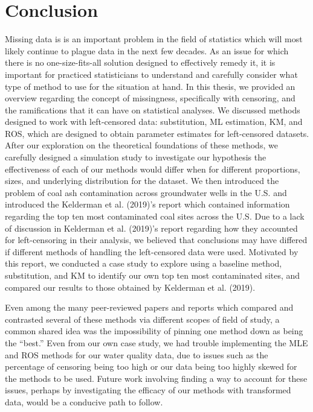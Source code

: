 \documentclass[12pt, twoside]{amherstthesis}
\begin{document}
\hypertarget{conclusion}{%
\chapter{Conclusion}\label{conclusion}}

Missing data is is an important problem in the field of statistics which will most likely continue to plague data in the next few decades. As an issue for which there is no one-size-fits-all solution designed to effectively remedy it, it is important for practiced statisticians to understand and carefully consider what type of method to use for the situation at hand. In this thesis, we provided an overview regarding the concept of missingness, specifically with censoring, and the ramifications that it can have on statistical analyses. We discussed methods designed to work with left-censored data: substitution, ML estimation, KM, and ROS, which are designed to obtain parameter estimates for left-censored datasets. After our exploration on the theoretical foundations of these methods, we carefully designed a simulation study to investigate our hypothesis the effectiveness of each of our methods would differ when for different proportions, sizes, and underlying distribution for the dataset. We then introduced the problem of coal ash contamination across groundwater wells in the U.S. and introduced the Kelderman et al. (2019)'s report which contained information regarding the top ten most contaminated coal sites across the U.S. Due to a lack of discussion in Kelderman et al. (2019)'s report regarding how they accounted for left-censoring in their analysis, we believed that conclusions may have differed if different methods of handling the left-censored data were used. Motivated by this report, we conducted a case study to explore using a baseline method, substitution, and KM to identify our own top ten most contaminated sites, and compared our results to those obtained by Kelderman et al. (2019).

Even among the many peer-reviewed papers and reports which compared and contrasted several of these methods via different scopes of field of study, a common shared idea was the impossibility of pinning one method down as being the ``best.'' Even from our own case study, we had trouble implementing the MLE and ROS methods for our water quality data, due to issues such as the percentage of censoring being too high or our data being too highly skewed for the methods to be used. Future work involving finding a way to account for these issues, perhaps by investigating the efficacy of our methods with transformed data, would be a conducive path to follow.
\end{document}

